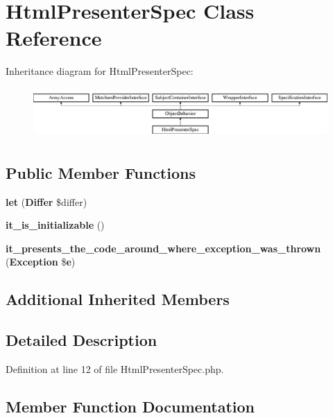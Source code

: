 \section{Html\+Presenter\+Spec Class Reference}
\label{classspec_1_1_php_spec_1_1_formatter_1_1_html_1_1_html_presenter_spec}
Inheritance diagram for Html\+Presenter\+Spec\+:\begin{figure}[H]
\begin{center}
\leavevmode
\includegraphics[height=1.953488cm]{classspec_1_1_php_spec_1_1_formatter_1_1_html_1_1_html_presenter_spec}
\end{center}
\end{figure}
\subsection*{Public Member Functions}
\begin{DoxyCompactItemize}
\item 
{\bf let} ({\bf Differ} \$differ)
\item 
{\bf it\+\_\+is\+\_\+initializable} ()
\item 
{\bf it\+\_\+presents\+\_\+the\+\_\+code\+\_\+around\+\_\+where\+\_\+exception\+\_\+was\+\_\+thrown} ({\bf Exception} \${\bf e})
\end{DoxyCompactItemize}
\subsection*{Additional Inherited Members}


\subsection{Detailed Description}


Definition at line 12 of file Html\+Presenter\+Spec.\+php.



\subsection{Member Function Documentation}
